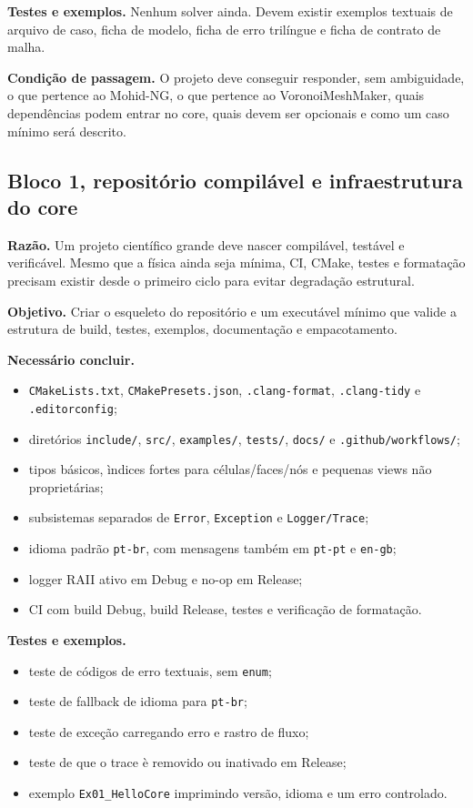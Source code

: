 \documentclass[11pt,a4paper]{article}
\begin{document}
\textbf{Testes e exemplos.} Nenhum solver ainda. Devem existir exemplos textuais de arquivo de caso, ficha de modelo, ficha de erro tril\'ingue e ficha de contrato de malha.

\textbf{Condi\c{c}\~ao de passagem.} O projeto deve conseguir responder, sem ambiguidade, o que pertence ao Mohid-NG, o que pertence ao VoronoiMeshMaker, quais depend\^encias podem entrar no core, quais devem ser opcionais e como um caso m\'inimo ser\'a descrito.

\subsection*{Bloco 1, reposit\'orio compil\'avel e infraestrutura do core}

\textbf{Raz\~ao.} Um projeto cient\'ifico grande deve nascer compil\'avel, test\'avel e verific\'avel. Mesmo que a f\'isica ainda seja m\'inima, CI, CMake, testes e formata\c{c}\~ao precisam existir desde o primeiro ciclo para evitar degrada\c{c}\~ao estrutural.

\textbf{Objetivo.} Criar o esqueleto do reposit\'orio e um execut\'avel m\'inimo que valide a estrutura de build, testes, exemplos, documenta\c{c}\~ao e empacotamento.

\textbf{Necess\'ario concluir.}
\begin{itemize}
  \item \texttt{CMakeLists.txt}, \texttt{CMakePresets.json}, \texttt{.clang-format}, \texttt{.clang-tidy} e \texttt{.editorconfig};
  \item diret\'orios \texttt{include/}, \texttt{src/}, \texttt{examples/}, \texttt{tests/}, \texttt{docs/} e \texttt{.github/workflows/};
  \item tipos b\'asicos, \`indices fortes para c\'elulas/faces/n\'os e pequenas views n\~ao propriet\'arias;
  \item subsistemas separados de \texttt{Error}, \texttt{Exception} e \texttt{Logger/Trace};
  \item idioma padr\~ao \texttt{pt-br}, com mensagens tamb\'em em \texttt{pt-pt} e \texttt{en-gb};
  \item logger RAII ativo em Debug e no-op em Release;
  \item CI com build Debug, build Release, testes e verifica\c{c}\~ao de formata\c{c}\~ao.
\end{itemize}

\textbf{Testes e exemplos.}
\begin{itemize}
  \item teste de c\'odigos de erro textuais, sem \texttt{enum};
  \item teste de fallback de idioma para \texttt{pt-br};
  \item teste de exce\c{c}\~ao carregando erro e rastro de fluxo;
  \item teste de que o trace \`e removido ou inativado em Release;
  \item exemplo \texttt{Ex01\_HelloCore} imprimindo vers\~ao, idioma e um erro controlado.
\end{itemize}
\end{document}
